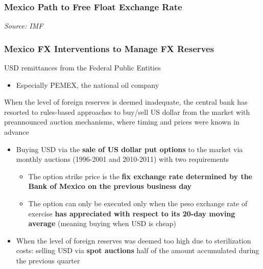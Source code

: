 \documentclass{beamer}
\newenvironment{wideitemize}{\itemize\addtolength{\itemsep}{10pt}}{\enditemize}
\begin{document}
\begin{frame}
  \frametitle{Mexico Path to Free Float Exchange Rate}
  \medskip
  \emph{Source: IMF \href{https://www.elibrary.imf.org/display/book/9781484375686/ch010.xml}{}}
\end{frame}


\begin{frame}
  \frametitle{Mexico FX Interventions to Manage FX Reserves}
  \begin{wideitemize}
  \item USD remittances from the Federal Public Entities
    \begin{itemize}
    \item Especially PEMEX, the national oil company
    \end{itemize}
  \item When the level of foreign reserves is deemed inadequate, the central bank has resorted to rules-based approaches to buy/sell US dollar from the market with preannounced auction mechanisms, where timing and prices were known in advance 
    \begin{itemize}
    \item Buying USD via the \textbf{sale of US dollar put options} to the market via monthly auctions (1996-2001 and 2010-2011) with two requirements
      \begin{itemize}
      \item The option strike price is the \textbf{fix exchange rate determined by the Bank of Mexico on the previous business day}
      \item The option can only be executed only when the peso exchange rate of exercise \textbf{has appreciated with respect to its 20-day moving average} (meaning buying when USD is cheap)
      \end{itemize}
    \item When the level of foreign reserves was deemed too high due to sterilization costs: selling USD via \textbf{spot auctions} half of the amount accumulated during the previous quarter
    \end{itemize}
  \end{wideitemize}
\end{frame}
\end{document}
